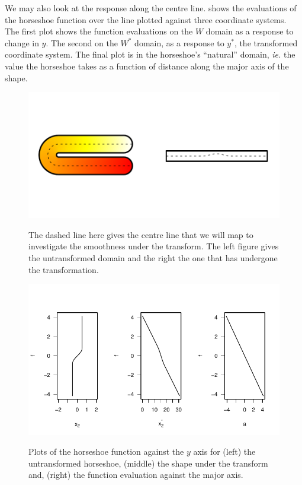 We may also look at the response along the centre line.  shows the evaluations of the horseshoe function over the line plotted against three coordinate systems. The first plot shows the function evaluations on the $W$ domain as a response to change in $y$. The second on the $W^*$ domain, as a response to $y^*$, the transformed coordinate system. The final plot is in the horseshoe's ``natural'' domain, \emph{ie.} the value the horseshoe takes as a function of distance along the major axis of the shape.

\begin{figure}
\centering
\includegraphics[trim=0.5in 1in 0in 1in]{figs/horseshoecentreline.pdf} \\
\caption{The dashed line here gives the centre line that we will map to investigate the smoothness under the \sch transform. The left figure gives the untransformed domain and the right the one that has undergone the transformation.}
\label{horseshoecentreline}
\end{figure}


\begin{figure}
\centering
\includegraphics[trim=0in 0in 0in 0in]{figs/centrelinelineplots.pdf} \\
\caption{Plots of the horseshoe function against the $y$ axis for (left) the untransformed horseshoe, (middle) the shape under the \sch transform and, (right) the function evaluation against the major axis.}
\label{centrelinelineplot}
\end{figure}

